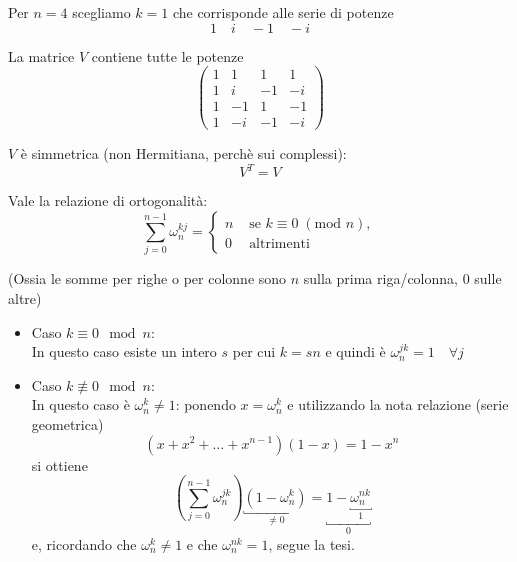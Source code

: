 \begin{example}
Per $n = 4$ scegliamo $k=1$ che corrisponde alle serie di potenze
$$ 1 \quad i \quad -1 \quad -i $$

La matrice $V$ contiene tutte le potenze
$$
\begin{pmatrix}
  1 & 1 & 1 & 1 \\
  1 & i & -1 & - i  \\
  1 & -1 & 1 & -1 \\
  1 & -i & -1 & - i
\end{pmatrix}
$$
\end{example}

\begin{property}
$V$ \`e simmetrica (non Hermitiana, perch\`e sui complessi):
 $$V^{T} = V$$
\end{property}

\begin{theo}
 Vale la relazione di ortogonalit\`a:
 \begin{equation}
   \label{dft:01}
    \displaystyle \sum_{j=0}^{n-1} \omega_{n}^{kj} =
      \left\{
      \begin{array}{ll}
        n & \text{ se } k \equiv 0\; (\text{mod } n), \\
        0 & \text{ altrimenti}
      \end{array}
    \right.   
 \end{equation}
 
(Ossia le somme per righe o per colonne sono  $n$ sulla prima riga/colonna,
      0 sulle altre)
\end{theo}
\begin{thproof}
\begin{itemize}
\item Caso  $k \equiv 0  \mod n$:  \\
In questo caso esiste un intero $s$ per cui $k=sn$
e quindi \`e $\omega_{n}^{jk}=1 \quad   \forall j $\\
\begin{comment}
  $$ \displaystyle \sum_{j=1}^{n-1}  \omega_n^{pnj} =
  \displaystyle \sum_{j=0}^{n-1} = n \quad \forall j$$
\end{comment}
\item Caso  $k \not \equiv 0 \mod n$:  \\
  In questo caso \`e $\omega_n^{k} \neq 1$: ponendo
  $x = \omega_n^{k}$ e utilizzando la nota relazione
  (serie geometrica)
  $$(x + x^{2} + \ldots + x^{n-1})(1-x) = 1 - x^{n}$$
  si ottiene
  $$
  \displaystyle (\sum_{j=0}^{n-1} \omega_n^{jk})\underbracket{(1 - \omega_n^{k})}_{\neq 0} 
  = \underbracket{1 - \underbracket{\omega_n^{nk}}_{1}}_{0}
  $$
  e, ricordando che $\omega_n^{k} \neq 1 $ e che $\omega_n^{nk} =1$,
  segue la tesi.
\end{itemize}  
\end{thproof}

